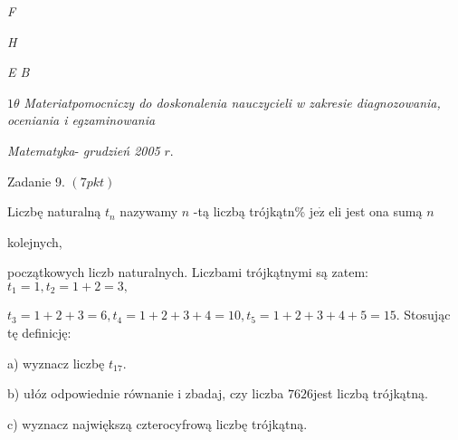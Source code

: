 \documentclass[a4paper,12pt]{article}
\begin{document}
{\it F}

{\it H}

{\it E B}





$ 1\theta$ {\it Materiatpomocniczy do doskonalenia nauczycieli w zakresie diagnozowania, oceniania i egzaminowania}

{\it Matematyka}- {\it grudzień 2005} $r.$

Zadanie 9. $(7pkt)$

Liczbę naturalną $t_{n}$ nazywamy $n$ -tą liczbą trójkątn\% $\mathrm{j}\mathrm{e}\dot{\mathrm{z}}$ eli jest ona sumą $n$

kolejnych,

początkowych liczb naturalnych. Liczbami trójkątnymi są zatem: $t_{1}=1, t_{2}=1+2=3,$

$t_{3}=1+2+3=6, t_{4}=1+2+3+4=10, t_{5}=1+2+3+4+5=15$. Stosując tę definicję:

a) wyznacz liczbę $t_{17}.$

b) ułóz odpowiednie równanie i zbadaj, czy liczba $7626$jest liczbą trójkątną.

c) wyznacz największą czterocyfrową liczbę trójkątną.
\end{document}
